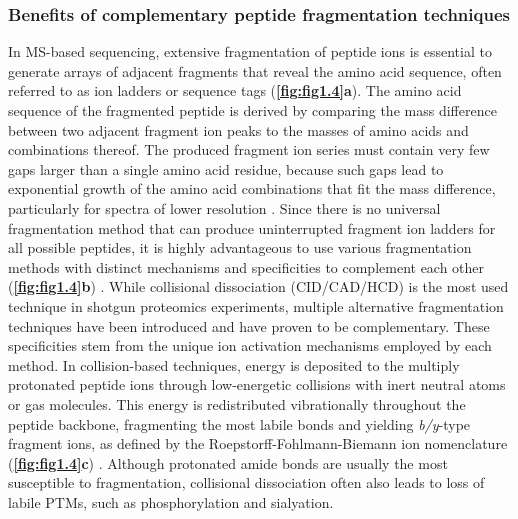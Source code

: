 \subsubsection{Benefits of complementary peptide fragmentation techniques}
In MS-based sequencing, extensive fragmentation of peptide ions is essential to generate arrays of adjacent fragments that reveal the amino acid sequence, often referred to as ion ladders or sequence tags (\textbf{\autoref{fig:fig1.4}a}). The amino acid sequence of the fragmented peptide is derived by comparing the mass difference between two adjacent fragment ion peaks to the masses of amino acids and combinations thereof. The produced fragment ion series must contain very few gaps larger than a single amino acid residue, because such gaps lead to exponential growth of the amino acid combinations that fit the mass difference, particularly for spectra of lower resolution \cite{he2018protein}. Since there is no universal fragmentation method that can produce uninterrupted fragment ion ladders for all possible peptides, it is highly advantageous to use various fragmentation methods with distinct mechanisms and specificities to complement each other (\textbf{\autoref{fig:fig1.4}b}) \cite{macias2020ion}. While collisional dissociation (CID/CAD/HCD) is the most used technique in shotgun proteomics experiments, multiple alternative fragmentation techniques have been introduced and have proven to be complementary. These specificities stem from the unique ion activation mechanisms employed by each method. In collision-based techniques, energy is deposited to the multiply protonated peptide ions through low-energetic collisions with inert neutral atoms or gas molecules. This energy is redistributed vibrationally throughout the peptide backbone, fragmenting the most labile bonds and yielding \emph{b/y}-type fragment ions, as defined by the Roepstorff-Fohlmann-Biemann ion nomenclature (\textbf{\autoref{fig:fig1.4}c}) \cite{roepstorff1984proposal}. Although protonated amide bonds are usually the most susceptible to fragmentation, collisional dissociation often also leads to loss of labile PTMs, such as phosphorylation and sialyation.

